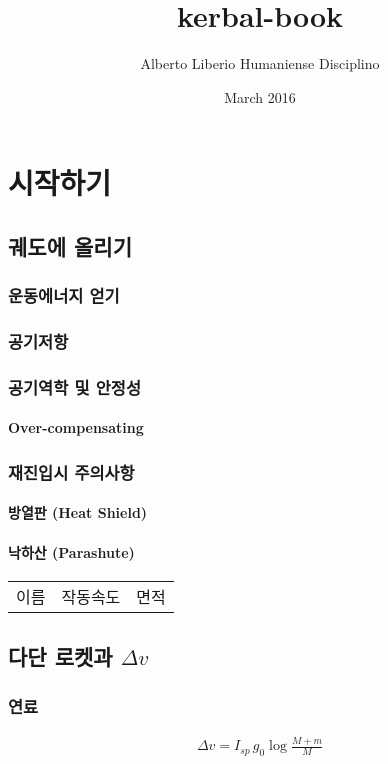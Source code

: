 \documentclass[10pt]{amsbook}
\title{kerbal-book}
\author{Alberto Liberio Humaniense Disciplino}
\date{March 2016}
\begin{document}
\maketitle
\sf

\tableofcontents
\part{시작하기}
\chapter{궤도에 올리기}
\section{운동에너지 얻기}
\section{공기저항}
\section{공기역학 및 안정성}
\subsection{Over-compensating}
\section{재진입시 주의사항}
\subsection{방열판 (Heat Shield)}
\subsection{낙하산 (Parashute)}

\begin{tabular}{|c|c|c|}
이름&작동속도&면적
\end{tabular}
\chapter{다단 로켓과 $\Delta v$}
\section{연료}

\begin{align}
    \Delta v =I_{sp}\, g_0\log\frac{M+m}{M}
\end{align}
\end{document}
